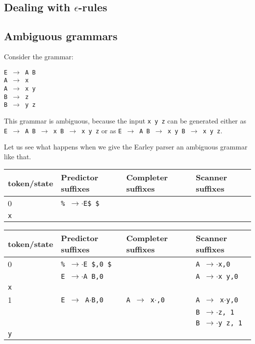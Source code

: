 \documentclass[11pt]{article}
\def\ra{\rightarrow}
\begin{document}
\subsection{Dealing with $\epsilon$-rules}

\subsection{Ambiguous grammars}

Consider the grammar:

\texttt{E $\ra$ A B\\A $\ra$ x\\A $\ra$ x y\\B $\ra$ z\\B $\ra$ y z} 

This grammar is ambiguous, because the input \texttt{x y z} can be
generated either as \texttt{E $\ra$ A B $\ra$ x B $\ra$ x y z} or as 
\texttt{E $\ra$ A B $\ra$ x y B $\ra$ x y z}.  

Let us see what happens when we give the Earley parser an ambiguous
grammar like that. 

\begin{tabular}{|l|l|l|l|}
\hline
token/state & Predictor suffixes & Completer suffixes & Scanner suffixes\\
\hline
0      & \texttt{\% $\rightarrow$$\cdot$E\$ \$} & & \\
\hline
\texttt{x} &  & &\\
\hline
\end{tabular}

\begin{tabular}{|l|l|l|l|}
\hline
token/state & Predictor suffixes & Completer suffixes & Scanner suffixes\\
\hline
0 & \texttt{\% $\rightarrow$$\cdot$E \$,0 \$} & & \texttt{A $\ra$$\cdot$x,0} \\
  & \texttt{E $\ra$$\cdot$A B,0} & & \texttt{A $\ra$$\cdot$x y,0}\\
\hline
\texttt{x} &  & &\\
\hline
1 & \texttt{E $\ra$ A$\cdot$B,0}& \texttt{A $\ra$ x$\cdot$,0} & \texttt{A $\ra$ x$\cdot$y,0}\\
  & & & \texttt{B $\ra$$\cdot$z, 1}\\
  & & & \texttt{B $\ra$$\cdot$y z, 1}\\
\hline
\texttt{y} &  & &\\
\hline
\end{tabular}
\end{document}
